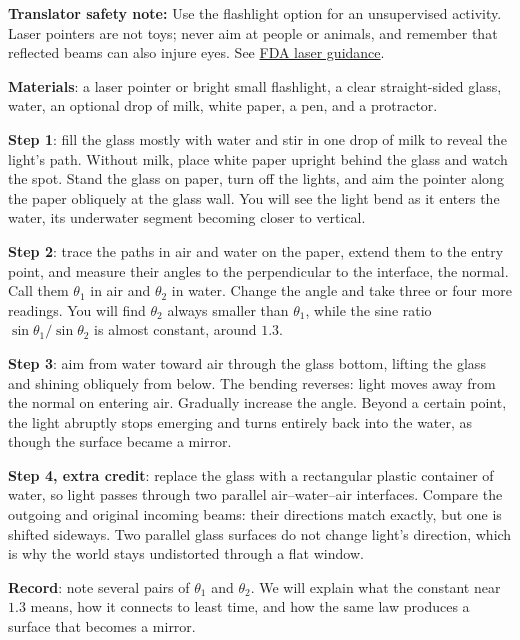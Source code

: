 \begin{experiment}
\textbf{Translator safety note:} Use the flashlight option for an unsupervised activity. Laser pointers are not toys; never aim at people or animals, and remember that reflected beams can also injure eyes. See \href{https://www.fda.gov/consumers/consumer-updates/laser-toys-how-keep-kids-safe}{FDA laser guidance}.

\textbf{Materials}: a laser pointer or bright small flashlight, a clear straight-sided glass, water, an optional drop of milk, white paper, a pen, and a protractor.

\textbf{Step 1}: fill the glass mostly with water and stir in one drop of milk to reveal the light's path. Without milk, place white paper upright behind the glass and watch the spot. Stand the glass on paper, turn off the lights, and aim the pointer along the paper obliquely at the glass wall. You will see the light bend as it enters the water, its underwater segment becoming closer to vertical.

\textbf{Step 2}: trace the paths in air and water on the paper, extend them to the entry point, and measure their angles to the perpendicular to the interface, the normal. Call them \(\theta_1\) in air and \(\theta_2\) in water. Change the angle and take three or four more readings. You will find \(\theta_2\) always smaller than \(\theta_1\), while the sine ratio \(\sin\theta_1/\sin\theta_2\) is almost constant, around \(1.3\).

\textbf{Step 3}: aim from water toward air through the glass bottom, lifting the glass and shining obliquely from below. The bending reverses: light moves away from the normal on entering air. Gradually increase the angle. Beyond a certain point, the light abruptly stops emerging and turns entirely back into the water, as though the surface became a mirror.

\textbf{Step 4, extra credit}: replace the glass with a rectangular plastic container of water, so light passes through two parallel air--water--air interfaces. Compare the outgoing and original incoming beams: their directions match exactly, but one is shifted sideways. Two parallel glass surfaces do not change light's direction, which is why the world stays undistorted through a flat window.

\textbf{Record}: note several pairs of \(\theta_1\) and \(\theta_2\). We will explain what the constant near \(1.3\) means, how it connects to least time, and how the same law produces a surface that becomes a mirror.
\end{experiment}

